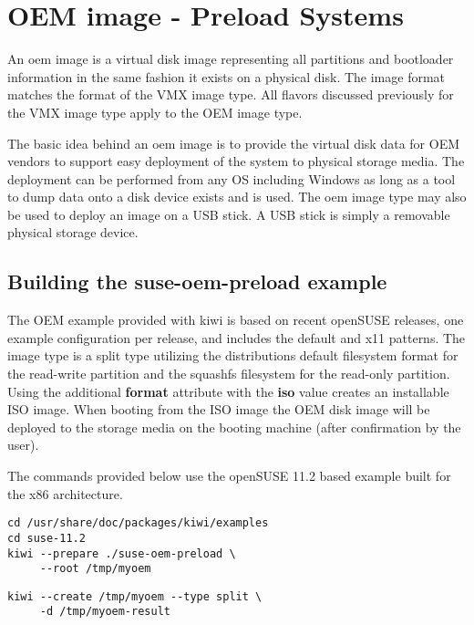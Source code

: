 \chapter{OEM image - Preload Systems}
\label{chapter:oem}
\minitoc

An oem image is a virtual disk image representing all partitions
and bootloader information in the same fashion it exists on a physical
disk. The image format matches the format of the VMX image type. All flavors
discussed previously for the VMX image type apply to the OEM image type.

The basic idea behind an oem image is to provide the virtual disk data
for OEM vendors to support easy deployment of the system to physical
storage media. The deployment can be performed from any OS including
Windows as long as a tool to dump data onto a disk device exists and is 
used. The oem image type may also be used to deploy an image on a USB stick. 
A USB stick is simply a removable physical storage device.

\section{Building the suse-oem-preload example}

The OEM example provided with kiwi is based on recent openSUSE releases, 
one example configuration per release, and includes the default and x11 
patterns. The image type is a split type utilizing the distributions default
filesystem format for the read-write partition and the squashfs filesystem 
for the read-only partition. Using the additional \textbf{format} attribute 
with the \textbf{iso} value creates an installable ISO image. When booting 
from the ISO image the OEM disk image will be deployed to the storage media
on the booting machine (after confirmation by the user).

The commands provided below use the openSUSE 11.2 based example built 
for the x86 architecture.

\begin{Command}{12cm}
\begin{verbatim}
cd /usr/share/doc/packages/kiwi/examples
cd suse-11.2
kiwi --prepare ./suse-oem-preload \
     --root /tmp/myoem
\end{verbatim}
\end{Command}

\begin{Command}{12cm}
\begin{verbatim}
kiwi --create /tmp/myoem --type split \
     -d /tmp/myoem-result
\end{verbatim}
\end{Command}

